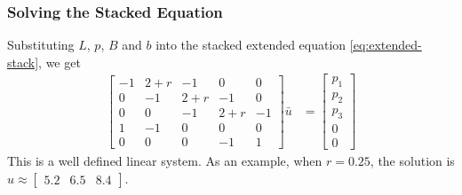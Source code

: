 \documentclass[11pt]{article}
\newcommand{\R}{\ensuremath{\mathbb{R}}}
\begin{document}
\subsubsection{Solving the Stacked Equation}

Substituting $L$, $p$, $B$ and $b$ into the stacked extended equation \cref{eq:extended-stack}, we get
\begin{align}
\begin{bmatrix}
	-1 & 2 + r & -1 & 0 & 0\\
	0 & -1 & 2+r & -1 & 0\\
	0 & 0 & -1 & 2+r & -1\\
	1 & -1 & 0 & 0 & 0\\
	0 & 0 & 0 & -1 & 1
\end{bmatrix} \bar{u} &= \begin{bmatrix} p_1 \\ p_2 \\ p_3 \\ 0 \\ 0\end{bmatrix}\label{eq:stacked-example-1}
\end{align}
This is a well defined linear system.  As an example, when $r = 0.25$, the solution is $u \approx \begin{bmatrix} 5.2 & 6.5 & 8.4\end{bmatrix}$.
	
\end{document}
